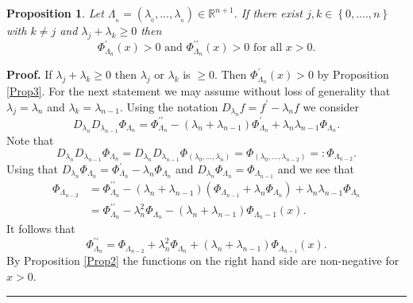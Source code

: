 \documentclass[11pt]{article}%
\newtheorem{proposition}[theorem]{Proposition}
\newenvironment{proof}[1][Proof]{\textbf{#1.} }{\ \rule{0.5em}{0.5em}}
\begin{document}
\begin{proposition}
\label{Prop4}Let $\Lambda_{_{n}}=\left(  \lambda_{_{0}},...,\lambda_{_{n}%
}\right)  \in\mathbb{R}^{n+1}.$ If there exist $j,k\in\left\{
0,....,n\right\}  $ with $k\neq j$ and $\lambda_{j}+\lambda_{k}\geq0$ then%
\[
\Phi_{\Lambda_{n}}^{\prime}\left(  x\right)  >0\text{ and }\Phi_{\Lambda_{n}%
}^{\prime\prime}\left(  x\right)  >0\text{ for all }x>0.
\]

\end{proposition}

\begin{proof}
If $\lambda_{j}+\lambda_{k}\geq0$ then $\lambda_{j}$ or $\lambda_{k}$ is
$\geq0.$ Then $\Phi_{\Lambda_{n}}^{\prime}\left(  x\right)  >0$ by Proposition
\ref{Prop3}. For the next statement we may assume without loss of generality
that $\lambda_{j}=\lambda_{n}$ and $\lambda_{k}=\lambda_{n-1}.$ Using the
notation $D_{\lambda_{n}}f=f^{\prime}-\lambda_{n}f$ we consider%
\[
D_{\lambda_{n}}D_{\lambda_{n-1}}\Phi_{\Lambda_{n}}=\Phi_{\Lambda_{n}}%
^{\prime\prime}-\left(  \lambda_{n}+\lambda_{n-1}\right)  \Phi_{\Lambda_{n}%
}^{\prime}+\lambda_{n}\lambda_{n-1}\Phi_{\Lambda_{n}}.
\]
Note that
\[
D_{\lambda_{n}}D_{\lambda_{n-1}}\Phi_{\Lambda_{n}}=D_{\lambda_{n}}%
D_{\lambda_{n-1}}\Phi_{\left(  \lambda_{0},...,\lambda_{n}\right)  }%
=\Phi_{\left(  \lambda_{0},...,\lambda_{n-2}\right)  }=:\Phi_{\Lambda_{n-2}}.
\]
Using that $D_{\lambda_{n}}\Phi_{\Lambda_{n}}=\Phi_{\Lambda_{n}}^{\prime
}-\lambda_{n}\Phi_{\Lambda_{n}}$ and $D_{\lambda_{n}}\Phi_{\Lambda_{n}}%
=\Phi_{\Lambda_{n-1}}$ and we see that
\begin{align*}
\Phi_{\Lambda_{n-2}}  &  =\Phi_{\Lambda_{n}}^{\prime\prime}-\left(
\lambda_{n}+\lambda_{n-1}\right)  \left(  \Phi_{\Lambda_{n-1}}+\lambda_{n}%
\Phi_{\Lambda_{n}}\right)  +\lambda_{n}\lambda_{n-1}\Phi_{\Lambda_{n}}\\
&  =\Phi_{\Lambda_{n}}^{\prime\prime}-\lambda_{n}^{2}\Phi_{\Lambda_{n}%
}-\left(  \lambda_{n}+\lambda_{n-1}\right)  \Phi_{\Lambda_{n}-1}\left(
x\right)  .
\end{align*}
It follows that%
\begin{equation}
\Phi_{\Lambda_{n}}^{\prime\prime}=\Phi_{\Lambda_{n-2}}+\lambda_{n}^{2}%
\Phi_{\Lambda_{n}}+\left(  \lambda_{n}+\lambda_{n-1}\right)  \Phi
_{\Lambda_{n-1}}\left(  x\right)  . \label{seconddeerid}%
\end{equation}
By Proposition \ref{Prop2} the functions on the right hand side are
non-negative for $x>0.$
\end{proof}
\end{document}
